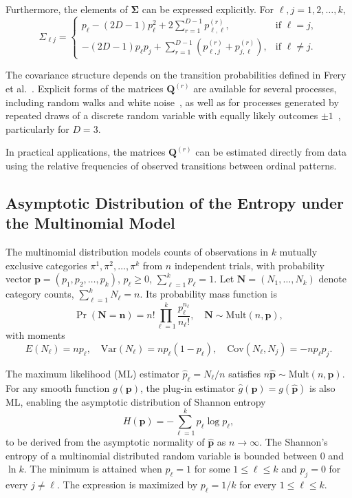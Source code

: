 \documentclass[12pt,a4paper]{article}
\begin{document}
Furthermore, the elements of $\boldsymbol{\Sigma}$ can be expressed explicitly. For $\ell, j = 1,2,\dots,k,$
\begin{equation}
	\Sigma_{\ell j} =
	\begin{cases}
		p_\ell - (2D-1)p_\ell^2 + 2 \displaystyle\sum_{r=1}^{D-1} p^{(r)}_{\ell,\ell}, & \text{if } \ell = j, \\[6pt]
		-(2D-1)p_\ell p_j + \displaystyle\sum_{r=1}^{D-1} \left( p^{(r)}_{\ell,j} + p^{(r)}_{j,\ell} \right), & \text{if } \ell \neq j.
	\end{cases}
\end{equation}

The covariance structure depends on the transition probabilities defined in Frery et al.~\cite{Frery2024}. Explicit forms of the matrices $\mathbf{Q}^{(r)}$ are available for several processes, including random walks and white noise~\cite{YamashitaRiosDeSousa2022}, as well as for processes generated by repeated draws of a discrete random variable with equally likely outcomes $\pm 1$~\cite{Elsinger2010}, particularly for $D=3$.

In practical applications, the matrices $\mathbf{Q}^{(r)}$ can be estimated directly from data using the relative frequencies of observed transitions between ordinal patterns.

\subsection {Asymptotic Distribution of the Entropy under the Multinomial Model}\label{Subsec:Multinomial} 

The multinomial distribution models counts of observations in $k$ mutually exclusive categories $\pi^1,\pi^2,\dots,\pi^k$ from $n$ independent trials, with probability vector $\mathbf{p} = (p_1, p_2, \dots, p_k)$, $p_\ell \ge 0$, $\sum_{\ell=1}^k p_\ell = 1$. Let $\mathbf{N} = (N_1, \dots, N_k)$ denote category counts, $\sum_{\ell=1}^k N_\ell = n$. Its probability mass function is
\[
\Pr(\mathbf{N} = \mathbf{n}) = n! \prod_{\ell=1}^k \frac{p_\ell^{n_\ell}}{n_\ell!}, \quad \mathbf{N} \sim \mathrm{Mult}(n, \mathbf{p}),
\]
with moments
\[
E(N_\ell) = n p_\ell, \quad
\mathrm{Var}(N_\ell) = n p_\ell (1-p_\ell), \quad
\mathrm{Cov}(N_\ell, N_j) = -n p_\ell p_j.
\]

The maximum likelihood (ML) estimator $\widehat{p}_\ell = N_\ell / n$ satisfies $n\widehat{\mathbf{p}} \sim \mathrm{Mult}(n,\mathbf{p})$. For any smooth function $g(\mathbf{p})$, the plug-in estimator $\widehat{g}(\mathbf{p}) = g(\widehat{\mathbf{p}})$ is also ML, enabling the asymptotic distribution of Shannon entropy
\begin{equation}
	H(\mathbf{p}) = -\sum_{\ell=1}^k p_\ell \log p_\ell,
	\label{eq:AsymEntropy}
\end{equation}
to be derived from the asymptotic normality of $\widehat{\mathbf{p}}$ as $n \to \infty$.
The Shannon's entropy of a multinomial distributed random variable is bounded between 0 and $\ln k$. The minimum is attained when $p_{\ell}=1$ for some $1\leq \ell \leq k$ and $p_j=0$ for every $j\ne \ell$. The expression is maximized by $p_{\ell}=1/k$ for every $1\leq \ell \leq k$.  
\end{document}
